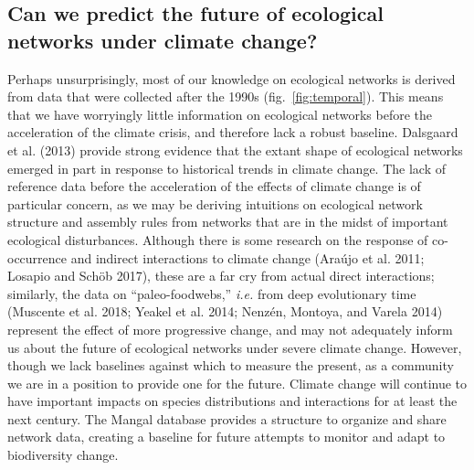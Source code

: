 \documentclass[10pt,oneside]{article}
\begin{document}
\hypertarget{can-we-predict-the-future-of-ecological-networks-under-climate-change}{%
\subsection{Can we predict the future of ecological networks under
climate
change?}\label{can-we-predict-the-future-of-ecological-networks-under-climate-change}}

Perhaps unsurprisingly, most of our knowledge on ecological networks is
derived from data that were collected after the 1990s
(fig.~\ref{fig:temporal}). This means that we have worryingly little
information on ecological networks before the acceleration of the
climate crisis, and therefore lack a robust baseline. Dalsgaard et al.
(2013) provide strong evidence that the extant shape of ecological
networks emerged in part in response to historical trends in climate
change. The lack of reference data before the acceleration of the
effects of climate change is of particular concern, as we may be
deriving intuitions on ecological network structure and assembly rules
from networks that are in the midst of important ecological
disturbances. Although there is some research on the response of
co-occurrence and indirect interactions to climate change (Araújo et al.
2011; Losapio and Schöb 2017), these are a far cry from actual direct
interactions; similarly, the data on ``paleo-foodwebs,'' \emph{i.e.}
from deep evolutionary time (Muscente et al. 2018; Yeakel et al. 2014;
Nenzén, Montoya, and Varela 2014) represent the effect of more
progressive change, and may not adequately inform us about the future of
ecological networks under severe climate change. However, though we lack
baselines against which to measure the present, as a community we are in
a position to provide one for the future. Climate change will continue
to have important impacts on species distributions and interactions for
at least the next century. The Mangal database provides a structure to
organize and share network data, creating a baseline for future attempts
to monitor and adapt to biodiversity change.
\end{document}
